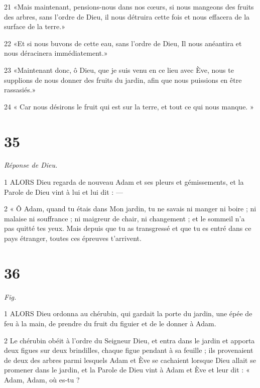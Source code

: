 \par 21 «Mais maintenant, pensions-nous dans nos cœurs, si nous mangeons des fruits des arbres, sans l'ordre de Dieu, il nous détruira cette fois et nous effacera de la surface de la terre.»

\par 22 «Et si nous buvons de cette eau, sans l'ordre de Dieu, Il nous anéantira et nous déracinera immédiatement.»

\par 23 «Maintenant donc, ô Dieu, que je suis venu en ce lieu avec Ève, nous te supplions de nous donner des fruits du jardin, afin que nous puissions en être rassasiés.»

\par 24 « Car nous désirons le fruit qui est sur la terre, et tout ce qui nous manque. »

\chapter{35}

\par \textit{Réponse de Dieu.}

\par 1 ALORS Dieu regarda de nouveau Adam et ses pleurs et gémissements, et la Parole de Dieu vint à lui et lui dit : —

\par 2 « Ô Adam, quand tu étais dans Mon jardin, tu ne savais ni manger ni boire ; ni malaise ni souffrance ; ni maigreur de chair, ni changement ; et le sommeil n'a pas quitté tes yeux. Mais depuis que tu as transgressé et que tu es entré dans ce pays étranger, toutes ces épreuves t’arrivent.

\chapter{36}

\par \textit{Fig.}

\par 1 ALORS Dieu ordonna au chérubin, qui gardait la porte du jardin, une épée de feu à la main, de prendre du fruit du figuier et de le donner à Adam.

\par 2 Le chérubin obéit à l'ordre du Seigneur Dieu, et entra dans le jardin et apporta deux figues sur deux brindilles, chaque figue pendant à sa feuille ; ils provenaient de deux des arbres parmi lesquels Adam et Ève se cachaient lorsque Dieu allait se promener dans le jardin, et la Parole de Dieu vint à Adam et Ève et leur dit : « Adam, Adam, où es-tu ?

